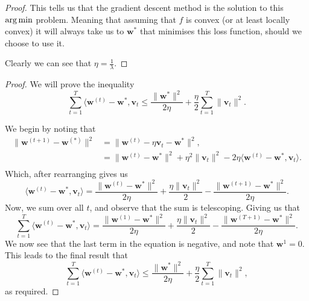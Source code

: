 \documentclass[twoside]{article}
\begin{document}
\begin{proof}
	This tells us that the gradient descent method is the solution to this $\operatorname*{arg\,min}$ problem. Meaning that
	assuming that $f$ is convex (or at least locally convex) it will always take us to $\bm{w}^{*}$
	that minimises this loss function, should we choose to use it.

	Clearly we can see that $\eta = \frac{1}{\lambda}$.
\end{proof}

\begin{proof}
	We will prove the inequality
	\begin{equation*}
		\sum_{t=1}^{T} \langle \bm{w}^{(t)} - \bm{w}^{*}, \bm{v}_{t}
		\leq \frac{\lVert \bm{w}^{*} \rVert^{2}}{2 \eta}
		+ \frac{\eta}{2}\sum_{t=1}^{T}\lVert \bm{v}_{t} \rVert^{2}.
	\end{equation*}

	We begin by noting that
	\begin{align*}
		\lVert \bm{w}^{(t+1)} - \bm{w}^{(*)} \rVert^{2}
		 & = \lVert \bm{w}^{(t)} - \eta \bm{v}_{t} - \bm{w}^{*} \rVert^{2},                                     \\
		 & = \lVert \bm{w}^{(t)} - \bm{w}^{*} \rVert^{2}
		+ \eta^{2} \lVert \bm{v}_{t} \rVert^{2} - 2 \eta \langle \bm{w}^{(t)} - \bm{w}^{*}, \bm{v}_{t} \rangle. \\
	\end{align*}
	Which, after rearranging gives us
	\begin{equation*}
		\langle \bm{w}^{(t)} - \bm{w}^{*}, \bm{v}_{t} \rangle
		= \frac{\lVert \bm{w}^{(t)} - \bm{w}^{*} \rVert^{2}}{2 \eta}
		+ \frac{\eta \lVert \bm{v}_{t} \rVert^{2}}{2}
		-  \frac{\lVert \bm{w}^{(t + 1)} - \bm{w}^{*} \rVert^{2}}{2 \eta}.
	\end{equation*}
	Now, we sum over all $t$, and observe that the sum is telescoping. Giving us that
	\begin{equation*}
		\sum_{t = 1}^{T} \langle \bm{w}^{(t)} - \bm{w}^{*}, \bm{v}_{t} \rangle
		= \frac{\lVert \bm{w}^{(1)} - \bm{w}^{*} \rVert^{2}}{2 \eta}
		+ \frac{\eta \lVert \bm{v}_{t} \rVert^{2}}{2}
		-  \frac{\lVert \bm{w}^{(T + 1)} - \bm{w}^{*} \rVert^{2}}{2 \eta}.
	\end{equation*}
	We now see that the last term in the equation is negative, and note that $\bm{w}^{1} = 0$.
	This leads to the final result that
	\begin{equation*}
		\sum_{t=1}^{T} \langle \bm{w}^{(t)} - \bm{w}^{*}, \bm{v}_{t}\rangle
		\leq \frac{\lVert \bm{w}^{*} \rVert^{2}}{2 \eta}
		+ \frac{\eta}{2}\sum_{t=1}^{T}\lVert \bm{v}_{t} \rVert^{2},
	\end{equation*}
	as required.

\end{proof}
\end{document}
